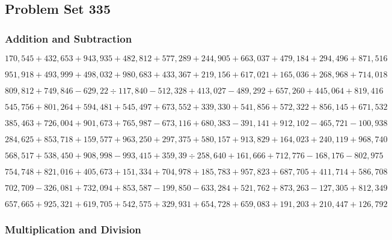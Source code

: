 \hypertarget{problem-set-335}{%
\subsection{Problem Set 335}\label{problem-set-335}}

\hypertarget{addition-and-subtraction}{%
\subsubsection{Addition and
Subtraction}\label{addition-and-subtraction}}

\(170,545+432,653+943,935+482,812+577,289+244,905+663,037+479,184+294,496+871,516\)

\(951,918+493,999+498,032+980,683+433,367+219,156+617,021+165,036+268,968+714,018\)

\(809,812+749,846-629,22÷117,840-512,328+413,027-489,292+657,260+445,064+819,416\)

\(545,756+801,264+594,481+545,497+673,552+339,330+541,856+572,322+856,145+671,532\)

\(385,463+726,004+901,673+765,987-673,116+680,383-391,141+912,102-465,721-100,938\)

\(284,625+853,718+159,577+963,250+297,375+580,157+913,829+164,023+240,119+968,740\)

\(568,517+538,450+908,998-993,415+359,39÷258,640+161,666+712,776-168,176-802,975\)

\(754,748+821,016+405,673+151,334+704,978+185,783+957,823+687,705+411,714+586,708\)

\(702,709-326,081+732,094+853,587-199,850-633,284+521,762+873,263-127,305+812,349\)

\(657,665+925,321+619,705+542,575+329,931+654,728+659,083+191,203+210,447+126,792\)

\hypertarget{multiplication-and-division}{%
\subsubsection{Multiplication and
Division}\label{multiplication-and-division}}

